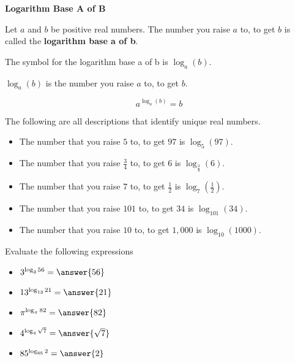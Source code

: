 \documentclass{ximera}
\begin{document}
\begin{definition} \textbf{\textcolor{green!50!black}{Logarithm Base A of B}}

Let $a$ and $b$ be positive real numbers.  The number  you raise $a$ to, to get $b$ is called the \textbf{logarithm base a of b}.

The symbol for the logarithm base a of b is $\log_a(b)$.


$\log_a(b)$ is  the number you raise $a$ to, to get $b$.

\[     a^{\log_a(b)} = b          \]




\end{definition}





\begin{example}
The following are all descriptions that identify unique real numbers.

\begin{itemize}
\item The number that you raise $5$ to, to get $97$ is $\log_5(97)$. \\
\item The number that you raise $\frac{3}{4}$ to, to get $6$ is $\log_{\tfrac{3}{4}}(6)$. \\
\item The number that you raise $7$ to, to get $\frac{1}{2}$ is $\log_7\left(\frac{1}{2}\right)$. \\
\item The number that you raise $101$ to, to get $34$ is $\log_{101}(34)$. \\
\item The number that you raise $10$ to, to get $1,000$ is $\log_{10}(1000)$. \\
\end{itemize}

\end{example}



\begin{example}
Evaluate the following expressions

\begin{itemize}
\item  $3^{\log_3{56}} = \answer{56}$
\item  $13^{\log_{13}{21}} = \answer{21}$
\item  $\pi^{\log_{\pi}{82}} = \answer{82}$
\item  $4^{\log_4{\sqrt{7}}} = \answer{\sqrt{7}}$
\item  $85^{\log_{85}{2}} = \answer{2}$

\end{itemize}

\end{example}
\end{document}
